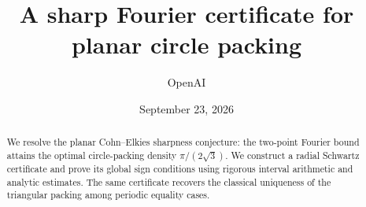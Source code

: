 \documentclass[11pt]{article}
\title{A sharp Fourier certificate for planar circle packing}
\author{OpenAI}
\date{September 23, 2026}
\theoremstyle{definition}
\theoremstyle{remark}
\numberwithin{equation}{section}
\begin{document}
\maketitle
\begin{abstract}
We resolve the planar Cohn--Elkies sharpness conjecture: the two-point
Fourier bound attains the optimal circle-packing density $\pi/(2\sqrt3)$.
We construct a radial Schwartz certificate and prove its global sign
conditions using rigorous interval arithmetic and analytic estimates.
The same certificate recovers the classical uniqueness of the triangular
packing among periodic equality cases.
\end{abstract}
\begingroup
\small
\tableofcontents
\endgroup
\clearpage







\appendix




\let\packingbibsection\bibsection
\renewcommand{\bibsection}{%
  \packingbibsection
  \addcontentsline{toc}{section}{\refname}%
}

\end{document}
